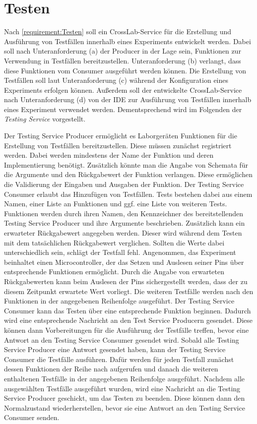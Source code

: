 \section{Testen}\label{section:konzeption:testen}

Nach \autoref{requirement:Testen} soll ein CrossLab-Service für die Erstellung und Ausführung von Testfällen innerhalb eines Experiments entwickelt werden. Dabei soll nach Unteranforderung (a) der Producer in der Lage sein, Funktionen zur Verwendung in Testfällen bereitzustellen. Unteranforderung (b) verlangt, dass diese Funktionen vom Consumer ausgeführt werden können. Die Erstellung von Testfällen soll laut Unteranforderung (c) während der Konfiguration eines Experiments erfolgen können. Außerdem soll der entwickelte CrossLab-Service nach Unteranforderung (d) von der IDE zur Ausführung von Testfällen innerhalb eines Experiment verwendet werden. Dementsprechend wird im Folgenden der \textit{Testing Service} vorgestellt.

Der Testing Service Producer ermöglicht es Laborgeräten Funktionen für die Erstellung von Testfällen bereitzustellen. Diese müssen zunächst registriert werden. Dabei werden mindestens der Name der Funktion und deren Implementierung benötigt. Zusätzlich könnte man die Angabe von Schemata für die Argumente und den Rückgabewert der Funktion verlangen. Diese ermöglichen die Validierung der Eingaben und Ausgaben der Funktion. Der Testing Service Consumer erlaubt das Hinzufügen von Testfällen. Tests bestehen dabei aus einem Namen, einer Liste an Funktionen und ggf. eine Liste von weiteren Tests. Funktionen werden durch ihren Namen, den Kennzeichner des bereitstellenden Testing Service Producer und ihre Argumente beschrieben. Zusätzlich kann ein erwarteter Rückgabewert angegeben werden. Dieser wird während dem Testen mit dem tatsächlichen Rückgabewert verglichen. Sollten die Werte dabei unterschiedlich sein, schlägt der Testfall fehl. Angenommen, das Experiment beinhaltet einen Microcontroller, der das Setzen und Auslesen seiner Pins über entsprechende Funktionen ermöglicht. Durch die Angabe von erwarteten Rückgabewerten kann beim Auslesen der Pins sichergestellt werden, dass der zu diesem Zeitpunkt erwartete Wert vorliegt. Die weiteren Testfälle werden nach den Funktionen in der angegebenen Reihenfolge ausgeführt. Der Testing Service Consumer kann das Testen über eine entsprechende Funktion beginnen. Dadurch wird eine entsprechende Nachricht an den Test Service Producern gesendet. Diese können dann Vorbereitungen für die Ausführung der Testfälle treffen, bevor eine Antwort an den Testing Service Consumer gesendet wird. Sobald alle Testing Service Producer eine Antwort gesendet haben, kann der Testing Service Consumer die Testfälle ausführen. Dafür werden für jeden Testfall zunächst dessen Funktionen der Reihe nach aufgerufen und danach die weiteren enthaltenen Testfälle in der angegebenen Reihenfolge ausgeführt. Nachdem alle ausgewählten Testfälle ausgeführt wurden, wird eine Nachricht an die Testing Service Producer geschickt, um das Testen zu beenden. Diese können dann den Normalzustand wiederherstellen, bevor sie eine Antwort an den Testing Service Consumer senden.

